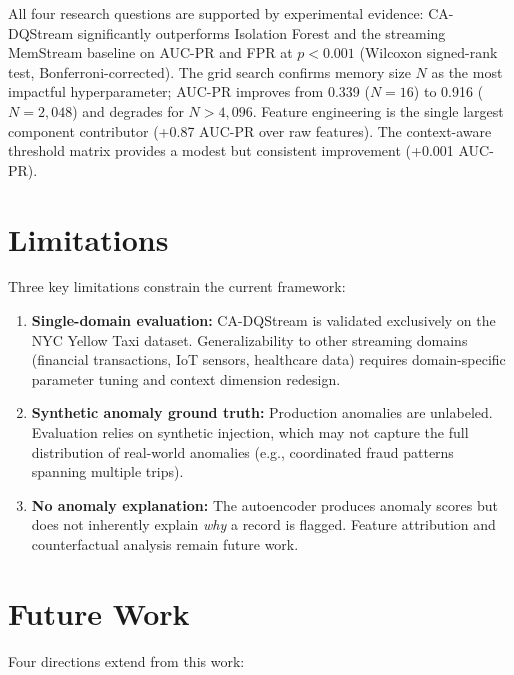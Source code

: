 All four research questions are supported by experimental evidence: CA-DQStream significantly outperforms Isolation Forest and the streaming MemStream baseline on AUC-PR and FPR at $p < 0.001$ (Wilcoxon signed-rank test, Bonferroni-corrected). The grid search confirms memory size $N$ as the most impactful hyperparameter; AUC-PR improves from 0.339 ($N=16$) to 0.916 ($N=2{,}048$) and degrades for $N > 4{,}096$. Feature engineering is the single largest component contributor (+0.87 AUC-PR over raw features). The context-aware threshold matrix provides a modest but consistent improvement (+0.001 AUC-PR).

\section{Limitations}

Three key limitations constrain the current framework:

\begin{enumerate}
    \item \textbf{Single-domain evaluation:} CA-DQStream is validated exclusively on the NYC Yellow Taxi dataset. Generalizability to other streaming domains (financial transactions, IoT sensors, healthcare data) requires domain-specific parameter tuning and context dimension redesign.

    \item \textbf{Synthetic anomaly ground truth:} Production anomalies are unlabeled. Evaluation relies on synthetic injection, which may not capture the full distribution of real-world anomalies (e.g., coordinated fraud patterns spanning multiple trips).

    \item \textbf{No anomaly explanation:} The autoencoder produces anomaly scores but does not inherently explain \emph{why} a record is flagged. Feature attribution and counterfactual analysis remain future work.
\end{enumerate}

\section{Future Work}

Four directions extend from this work:

